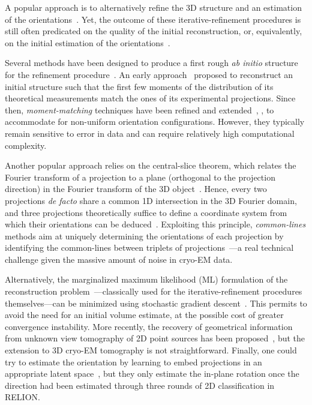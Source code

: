 
A popular approach is to alternatively refine the 3D structure and an estimation of the orientations~\cite{penczek1994ribosome,Baker1996,Dempster1977,sigworth1998maximum,scheres2012bayesian,zehni2020joint}.
Yet, the outcome of these iterative-refinement procedures is still often predicated on the quality of the initial reconstruction, or, equivalently, on the initial estimation of the orientations~\cite{sorzano2006optimization,henderson2012outcome}.

Several methods have been designed to produce a first rough \textit{ab initio} structure for the refinement procedure~\cite{singer2020computational}.
An early approach~\cite{kam1980reconstruction} proposed to reconstruct an initial structure such that the first few moments of the distribution of its theoretical measurements match the ones of its experimental projections.
Since then, \textit{moment-matching} techniques have been refined and extended~\cite{salzman1990method,goncharov1988integral,sharon2019method}, \eg, to accommodate for non-uniform orientation configurations.
However, they typically remain sensitive to error in data and can require relatively high computational complexity.

Another popular approach relies on the central-slice theorem, which relates the Fourier transform of a projection to a plane (orthogonal to the projection direction) in the Fourier transform of the 3D object~\cite{Natterer2001mathematics}.
Hence, every two projections \textit{de facto} share a common 1D intersection in the 3D Fourier domain, and three projections theoretically suffice to define a coordinate system from which their orientations can be deduced~\cite{van1987angular}.
Exploiting this principle, \textit{common-lines} methods aim at uniquely determining the orientations of each projection by identifying the common-lines between triplets of projections~\cite{penczek1994ribosome,mallick2006structure,singer2010detecting,wang2013orientation,greenberg2017common,pragier2019common}---a real technical challenge given the massive amount of noise in cryo-EM data.

Alternatively, the marginalized maximum likelihood (ML) formulation of the reconstruction problem~\cite{sigworth1998maximum}---classically used for the iterative-refinement procedures themselves---can be minimized using stochastic gradient descent~\cite{punjani2017cryosparc}.
This permits to avoid the need for an initial volume estimate, at the possible cost of greater convergence instability.
More recently, the recovery of geometrical information from unknown view tomography of 2D point sources has been proposed~\cite{zehni2019distance}, but the extension to 3D cryo-EM tomography is not straightforward.
Finally, one could try to estimate the orientation by learning to embed projections in an appropriate latent space~\cite{miolane2019estimation}, but they only estimate the in-plane rotation once the direction had been estimated through three rounds of 2D classification in RELION\@.

